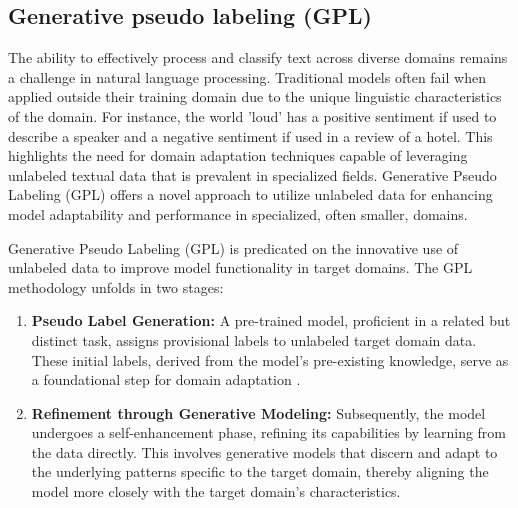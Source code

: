 \documentclass[fleqn,moreauthors,10pt]{ds_report}
\begin{document}
\subsection*{Generative pseudo labeling (GPL)}

The ability to effectively process and classify text across diverse domains remains a challenge in natural language processing. 
Traditional models often fail when applied outside their training domain due to the unique linguistic characteristics of the domain.
For instance, the world 'loud' has a positive sentiment if used to describe a speaker and a negative sentiment if used in a review of a hotel.
This highlights the need for domain adaptation techniques capable of leveraging unlabeled textual data that is prevalent in specialized fields. 
Generative Pseudo Labeling (GPL) \cite{gpl} offers a novel approach to utilize unlabeled data for enhancing model adaptability and performance in specialized, often smaller, domains.

Generative Pseudo Labeling (GPL) is predicated on the innovative use of unlabeled data to improve model functionality in target domains. 
The GPL methodology unfolds in two stages:
\begin{enumerate}
    \item \textbf{Pseudo Label Generation:} A pre-trained model, proficient in a related but distinct task, assigns provisional labels to unlabeled target domain data. These initial labels, derived from the model's pre-existing knowledge, serve as a foundational step for domain adaptation \cite{reimers2019sentence}.
    
    \item \textbf{Refinement through Generative Modeling:} Subsequently, the model undergoes a self-enhancement phase, refining its capabilities by learning from the data directly. 
    This involves generative models that discern and adapt to the underlying patterns specific to the target domain, thereby aligning the model more closely with the target domain's characteristics.
\end{enumerate}
\end{document}
